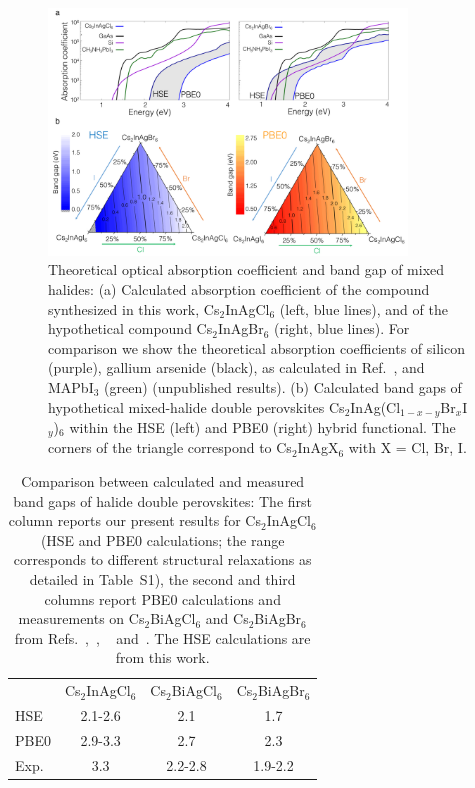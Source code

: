 \documentclass[journal=jpcl,manuscript=letter,layout=traditional]{achemso}
\begin{document}
\begin{figure}[ht!]
\begin{center}
\includegraphics[width=0.85\textwidth]{figure4.png}
\end{center}
\caption{\label{fig:4}
  Theoretical optical absorption coefficient and band gap of mixed halides: (a) Calculated
  absorption coefficient of the compound synthesized in this work, Cs$_2$InAgCl$_6$ (left, blue lines),
  and of the hypothetical compound Cs$_2$InAgBr$_6$ (right, blue lines). For comparison we show the
  theoretical absorption coefficients of silicon (purple), gallium arsenide (black),
  as calculated in Ref.~, and MAPbI$_3$
  (green) (unpublished results). (b)  Calculated
  band gaps of hypothetical mixed-halide double perovskites Cs$_2$InAg(Cl$_{1-x-y}$Br$_x$I$_y$)$_6$
  within the HSE (left) and PBE0 (right) hybrid functional. The corners of the triangle correspond
  to Cs$_2$InAgX$_6$ with X = Cl, Br, I.
  }
\end{figure}

\newpage

\begin{table}[t!]
\begin{center}
\caption{Comparison between calculated and measured band gaps of halide double perovskites:
  The first column reports our present results for Cs$_2$InAgCl$_6$ (HSE and PBE0 calculations;
  the range corresponds to different structural relaxations as detailed in Table~S1),
  the second and third columns report PBE0 calculations and measurements on Cs$_2$BiAgCl$_6$ and
  Cs$_2$BiAgBr$_6$ from Refs.~,~, ~
  and~. The HSE calculations are from this work.}
  \setlength{\tabcolsep}{0.5em}
  \begin{tabular}{l c | c c}
  \\[-8pt]
  \rowcolor{black!10}    & Cs$_2$InAgCl$_6$  & Cs$_2$BiAgCl$_6$  & Cs$_2$BiAgBr$_6$\\
  HSE & 2.1-2.6  & 2.1 & 1.7 \\
  PBE0  & 2.9-3.3  & 2.7 & 2.3 \\
  Exp.  & 3.3  & 2.2-2.8 &  1.9-2.2
  \end{tabular}
  \label{table1}
  \end{center}
\end{table}
\end{document}

